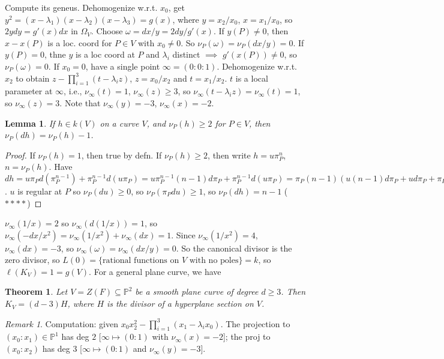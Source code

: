\documentclass{article}
\theoremstyle{definition}
\theoremstyle{remark}
\newtheorem{rem}{Remark}
\theoremstyle{plain}
\newtheorem{lem}[defn]{Lemma}
\newtheorem{thm}[defn]{Theorem}
\newcommand{\PP}{\mathbb{P}}
\begin{document}
Compute its geneus. Dehomogenize w.r.t. $x_0$, get $y^2=(x-\lambda_1)(x-\lambda_2)(x-\lambda_3)=g(x)$, where $y=x_2/x_0$, $x=x_1/x_0$, so $2ydy=g'(x)dx$ in $\Omega_V$. Choose $\omega=dx/y=2dy/g'(x)$. If $y(P)\neq 0$, then $x-x(P)$ is a loc. coord for $P\in V$ with $x_0\neq 0$. So $\nu_P(\omega)=\nu_P(dx/y)=0$. If $y(P)=0$, thne $y$ is a loc coord at $P$ and $\lambda_i$ distinct $\implies$ $g'(x(P))\neq 0$, so $\nu_P(\omega)=0$. If $x_0=0$, have a single point $\infty=(0:0:1)$. Dehomogenize w.r.t. $x_2$ to obtain $z-\prod_{i=1}^3(t-\lambda_iz)$, $z=x_0/x_2$ and $t=x_1/x_2$. $t$ is a local parameter at $\infty$, i.e., $\nu_\infty(t)=1$, $\nu_\infty(z)\ge 3$, so $\nu_\infty(t-\lambda_iz)=\nu_\infty(t)=1$, so $\nu_\infty(z)=3$. Note that $\nu_\infty(y)=-3$, $\nu_\infty(x)=-2$.
\begin{lem}
    If $h\in k(V)$ on a curve $V$, and $\nu_P(h)\ge 2$ for $P\in V$, then $\nu_P(dh)=\nu_P(h)-1$.
\end{lem}
\begin{proof}
    If $\nu_P(h)=1$, then true by defn. If $\nu_P(h)\ge 2$, then write $h=u\pi_P^n$, $n=\nu_P(h)$. Have $dh=u\pi_Pd(\pi_P^{n-1})+\pi_P^{n-1}d(u\pi_P)=u\pi_P^{n-1}(n-1)d\pi_P+\pi_P^{n-1}d(u\pi_P)=\pi_P(n-1)(u(n-1)d\pi_P+ud\pi_P+\pi_Pdu)=\pi_P^{n-1}[und\pi_P+\pi_Pdu]$. $u$ is regular at $P$ so $\nu_P(du)\ge 0$, so $\nu_P(\pi_Pdu)\ge 1$, so $\nu_P(dh)=n-1$ ($\ast\ast\ast\ast$)
\end{proof}
$\nu_\infty(1/x)=2$ so $\nu_\infty(d(1/x))=1$, so $\nu_\infty(-dx/x^2)=\nu_\infty(1/x^2)+\nu_\infty(dx)=1$. Since $\nu_\infty(1/x^2)=4$, $\nu_\infty(dx)=-3$, so $\nu_\infty(\omega)=\nu_\infty(dx/y)=0$. So the canonical divisor is the zero divisor, so $L(0)=\{\text{rational functions on }V\text{ with no poles}\}=k$, so $\ell(K_V)=1=g(V)$. For a general plane curve, we have
\begin{thm}
    Let $V=Z(F)\subseteq\PP^2$ be a smooth plane curve of degree $d\ge 3$. Then $K_V=(d-3)H$, where $H$ is the divisor of a hyperplane section on $V$.
\end{thm}
\begin{rem}
    Computation: given $x_0x_2^2-\prod_{i=1}^3(x_1-\lambda_ix_0)$. The projection to $(x_0:x_1)\in\PP^1$ has deg $2$ [$\infty\mapsto (0:1)$ with $\nu_\infty(x)=-2$]; the proj to $(x_0:x_2)$ has deg $3$ [$\infty\mapsto (0:1)$ and $\nu_\infty(y)=-3$].
\end{rem}
\end{document}
